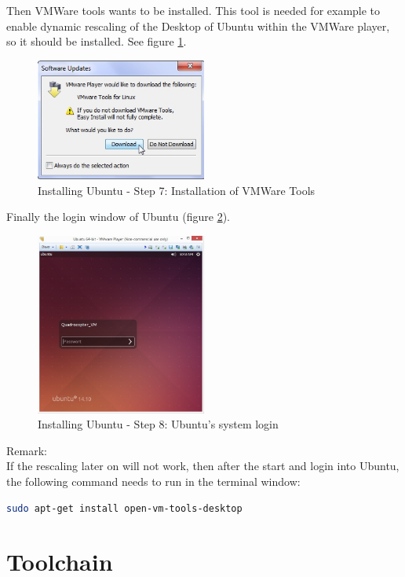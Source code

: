 Then VMWare tools wants to be installed. This tool is needed for example to enable dynamic rescaling of the Desktop of Ubuntu within the VMWare player, so it should be installed. See figure \ref{fig:Ub7}.

\begin{figure}[H]
	\centering\includegraphics[width=0.5\textwidth]{fig/Dev_Concept/Ub7.jpg}
	\caption{Installing Ubuntu - Step 7: Installation of VMWare Tools}
	\label{fig:Ub7}
\end{figure}

Finally the login window of Ubuntu (figure \ref{fig:Ub9}).

\begin{figure}[H]
	\centering\includegraphics[width=0.5\textwidth]{fig/Dev_Concept/Ub9.jpg}
	\caption{Installing Ubuntu - Step 8: Ubuntu's system login}
	\label{fig:Ub9}
\end{figure}

Remark:\\
If the rescaling later on will not work, then after the start and login into Ubuntu, the following command needs to run in the terminal window:
\begin{lstlisting}[language=bash,otherkeywords={sudo,tar,touch,gedit,cp,apt-get,mkdir}]
sudo apt-get install open-vm-tools-desktop
\end{lstlisting}


\section{Toolchain}
\label{subsec:sec-TC}

